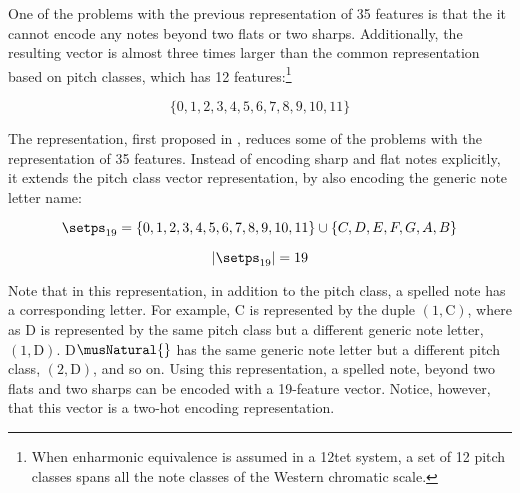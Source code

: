
One of the problems with the previous representation of 35
features is that the it cannot encode any notes beyond two
flats or two sharps. Additionally, the resulting vector is
almost three times larger than the common representation
based on pitch classes, which has 12 features:\footnote{When
enharmonic equivalence is assumed in a \gls{12tet} system, a
set of 12 pitch classes spans all the note classes of the
Western chromatic scale.}

\begin{equation}
    \{0, 1, 2, 3, 4, 5, 6, 7, 8, 9, 10, 11\}
\end{equation}

The representation, first proposed in
\textcite{napoleslopez2021augmentednet}, reduces some of the
problems with the representation of 35 features. Instead of
encoding \gls{sharp} and \gls{flat} notes explicitly, it
extends the pitch class vector representation, by also
encoding the generic note letter name:

\begin{equation}
    \label{eq:pitch_spelling_19}
    \setps_{19} = \{0, 1, 2, 3, 4, 5, 6, 7, 8, 9, 10, 11\} 
    \cup \{C, D, E, F, G, A, B\}
\end{equation}


\begin{equation}
    \label{eq:pitch_spelling_19_magnitude}
    | \setps_{19} | = 19
\end{equation}

Note that in this representation, in addition to the pitch
class, a spelled note has a corresponding letter. For
example, C\musSharp{} is represented by the duple $(1,
\text{C})$, where as D\musFlat{} is represented by the same
pitch class but a different generic note letter, $(1,
\text{D})$. D$\musNatural{}$ has the same generic note
letter but a different pitch class, $(2, \text{D})$, and so
on. Using this representation, a spelled note, beyond two
flats and two sharps can be encoded with a 19-feature
vector. Notice, however, that this vector is a two-hot
encoding representation.
